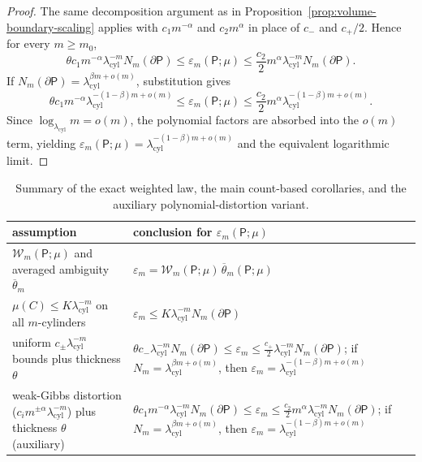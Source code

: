\begin{proof}
The same decomposition argument as in Proposition~\ref{prop:volume-boundary-scaling}
applies with $c_1 m^{-\alpha}$ and $c_2 m^\alpha$ in place of $c_-$ and
$c_+/2$.  Hence for every $m\ge m_0$,
\[
\theta c_1 m^{-\alpha}\lambda_{\mathrm{cyl}}^{-m}N_m(\partial\mathsf{P})
\le\varepsilon_m(\mathsf{P};\mu)
\le \frac{c_2}{2}m^{\alpha}\lambda_{\mathrm{cyl}}^{-m}N_m(\partial\mathsf{P}).
\]
If $N_m(\partial\mathsf{P})=\lambda_{\mathrm{cyl}}^{\beta m+o(m)}$, substitution
gives
\[
\theta c_1 m^{-\alpha}\lambda_{\mathrm{cyl}}^{-(1-\beta)m+o(m)}
\le\varepsilon_m(\mathsf{P};\mu)
\le \frac{c_2}{2}m^{\alpha}\lambda_{\mathrm{cyl}}^{-(1-\beta)m+o(m)}.
\]
Since $\log_{\lambda_{\mathrm{cyl}}} m=o(m)$, the polynomial factors are
absorbed into the $o(m)$ term, yielding
$\varepsilon_m(\mathsf{P};\mu)=\lambda_{\mathrm{cyl}}^{-(1-\beta)m+o(m)}$ and the
equivalent logarithmic limit.
\end{proof}

\begin{table}[ht]
\centering\small
\begin{tabular}{p{2.8in}p{3.1in}}
\toprule
assumption & conclusion for $\varepsilon_m(\mathsf{P};\mu)$ \\
\midrule
$\mathcal{W}_m(\mathsf{P};\mu)$ and averaged ambiguity $\overline{\theta}_m$ &
$\varepsilon_m=\mathcal{W}_m(\mathsf{P};\mu)\,\overline{\theta}_m(\mathsf{P};\mu)$ \\
$\mu(C)\le K\lambda_{\mathrm{cyl}}^{-m}$ on all $m$-cylinders &
$\varepsilon_m\le K\lambda_{\mathrm{cyl}}^{-m}N_m(\partial\mathsf{P})$ \\
uniform $c_\pm\lambda_{\mathrm{cyl}}^{-m}$ bounds plus thickness $\theta$ &
$\theta c_-\lambda_{\mathrm{cyl}}^{-m}N_m(\partial\mathsf{P})\le\varepsilon_m
\le \frac{c_+}{2}\lambda_{\mathrm{cyl}}^{-m}N_m(\partial\mathsf{P})$;
if $N_m=\lambda_{\mathrm{cyl}}^{\beta m+o(m)}$, then
$\varepsilon_m=\lambda_{\mathrm{cyl}}^{-(1-\beta)m+o(m)}$ \\
weak-Gibbs distortion ($c_i m^{\pm\alpha}\lambda_{\mathrm{cyl}}^{-m}$) plus thickness $\theta$ (auxiliary) &
$\theta c_1 m^{-\alpha}\lambda_{\mathrm{cyl}}^{-m}N_m(\partial\mathsf{P})\le\varepsilon_m\le \frac{c_2}{2}m^{\alpha}\lambda_{\mathrm{cyl}}^{-m}N_m(\partial\mathsf{P})$;
if $N_m=\lambda_{\mathrm{cyl}}^{\beta m+o(m)}$, then $\varepsilon_m=\lambda_{\mathrm{cyl}}^{-(1-\beta)m+o(m)}$ \\
\bottomrule
\end{tabular}
\caption{Summary of the exact weighted law, the main count-based corollaries,
and the auxiliary polynomial-distortion variant.}
\label{tab:rate-laws}
\end{table}

